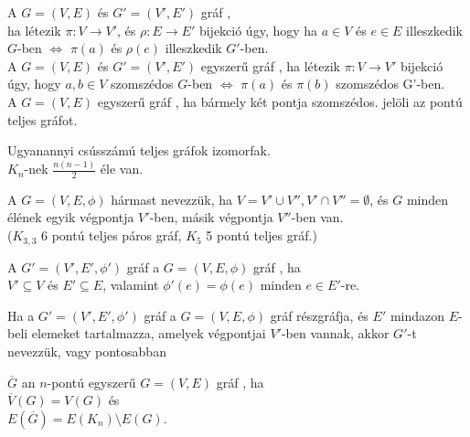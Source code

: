 \begin{frame}

\begin{tcolorbox}[title={Def.: Gráfok izomorfiája}]
A $G = (V, E)$ és $G' = (V', E')$ gráf ,\\
ha létezik ${\pi} : V \rightarrow V'$, és $\rho : E \rightarrow E'$ bijekció úgy, hogy ha $a \in V$ és $e \in E$ illeszkedik $G$-ben $\iff$ ${\pi}(a)$ és ${\rho}(e)$ illeszkedik $G'$-ben.\\
\mbigskip
A $G = (V, E)$ és $G' = (V', E')$ egyszerű gráf , ha létezik ${\pi} : V \rightarrow V'$ bijekció úgy, hogy $a, b \in V$ szomszédos $G$-ben $\iff$ ${\pi}(a)$ és ${\pi}(b)$ szomszédos G'-ben.\\
\mbigskip
A $G = (V, E)$ egyszerű gráf , ha bármely két pontja szomszédos.  jelöli az  pontú teljes gráfot.
\end{tcolorbox}

\begin{tcolorbox}[title={Ész}]
Ugyanannyi csússzámú teljes gráfok izomorfak.\\
\mbigskip
$K_n$-nek $\frac{n(n - 1)}{2}$ éle van.
\end{tcolorbox}
\end{frame}

\begin{frame}

\begin{tcolorbox}[title={Def.: Páros Gráf}]
A $G = (V, E, {\phi})$ hármast  nevezzük, ha $V = V' \cup V'', V' \cap V'' = \emptyset$, és $G$ minden élének egyik végpontja $V'$-ben, másik végpontja $V''$-ben van.\\
\mmedskip
($K_{3, 3}$ 6 pontú teljes páros gráf, $K_5$ 5 pontú teljes gráf.)
\end{tcolorbox}
\begin{tcolorbox}[title={Def.: Részgráf}]
A $G' = (V', E', {\phi}')$ gráf a $G = (V, E, {\phi})$ gráf , ha\\
$V' \subseteq V$ és $E' \subseteq E$, valamint ${\phi}'(e) = {\phi}(e)$ minden $e \in E'$-re.
\end{tcolorbox}
\begin{tcolorbox}[title={Def.: Telített Részgráf}]
Ha a $G' = (V', E', {\phi}')$ gráf a $G = (V, E, {\phi})$ gráf részgráfja, és $E'$ mindazon $E$-beli elemeket tartalmazza, amelyek végpontjai $V'$-ben vannak, akkor $G'$-t  nevezzük, vagy pontosabban 
\end{tcolorbox}
\begin{tcolorbox}[title={Komplementer Gráf}]
$\overline{G}$ an $n$-pontú egyszerű $G = (V, E)$ gráf , ha\\
\msmallskip
$\overline{V}(G) = V(G)$ és\\
$E(\overline{G}) = E(K_n) \setminus E(G)$.
\end{tcolorbox}

\end{frame}


